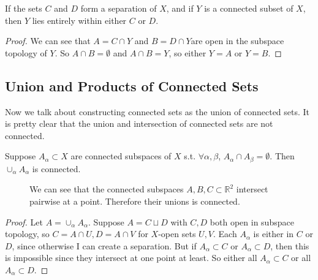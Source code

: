   \begin{lemma}
    If the sets $C$ and $D$ form a separation of $X$, and if $Y$ is a connected subset of $X$, then $Y$ lies entirely within either $C$ or $D$. 
  \end{lemma}
  \begin{proof}
    We can see that $A = C \cap Y$ and $B = D \cap Y$are open in the subspace topology of $Y$. So $A \cap B = \emptyset$ and $A \cap B = Y$, so either $Y = A$ or $Y = B$. 
  \end{proof}

\subsection{Union and Products of Connected Sets}

  Now we talk about constructing connected sets as the union of connected sets. It is pretty clear that the union and intersection of connected sets are not connected. 

  \begin{theorem}
    Suppose $A_\alpha \subset X$ are connected subspaces of $X$ s.t. $\forall \alpha, \beta$, $A_\alpha \cap A_\beta = \emptyset$. Then $\cup_\alpha A_\alpha$ is connected. 

    \begin{figure}[H]
      \centering 
      \caption{We can see that the connected subspaces $A, B, C \subset \mathbb{R}^2$ intersect pairwise at a point. Therefore their unions is connected. } 
    \end{figure}
  \end{theorem}
  \begin{proof}
    Let $A = \cup_\alpha A_\alpha$. Suppose $A = C \sqcup D$ with $C, D$ both open in subspace topology, so $C = A \cap U, D = A \cap V$ for $X$-open sets $U, V$. Each $A_\alpha$ is either in $C$ or $D$, since otherwise I can create a separation. But if $A_\alpha \subset C$ or $A_\alpha \subset D$, then this is impossible since they intersect at one point at least. So either all $A_\alpha \subset C$ or all $A_\alpha \subset D$. 
  \end{proof} 

